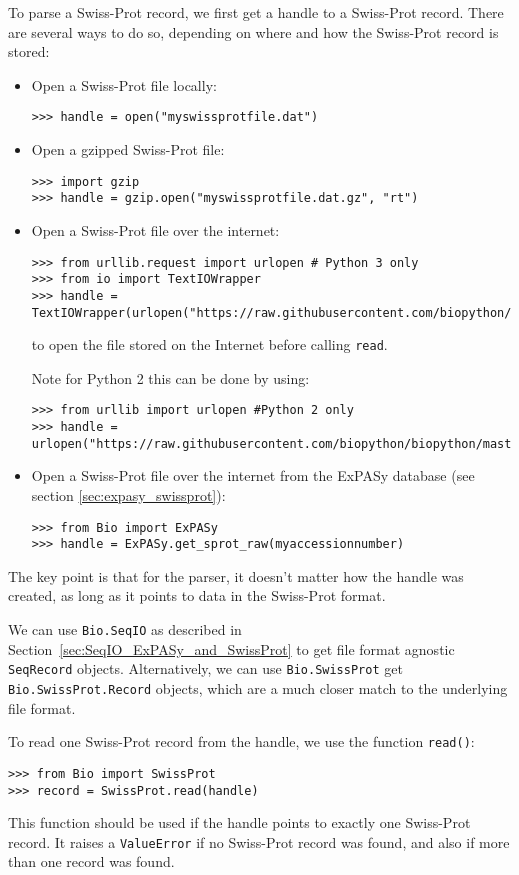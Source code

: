 To parse a Swiss-Prot record, we first get a handle to a Swiss-Prot record. There are several ways to do so, depending on where and how the Swiss-Prot record is stored:
\begin{itemize}
\item Open a Swiss-Prot file locally:
\begin{verbatim}
>>> handle = open("myswissprotfile.dat")
\end{verbatim} 
\item Open a gzipped Swiss-Prot file:
\begin{verbatim}
>>> import gzip
>>> handle = gzip.open("myswissprotfile.dat.gz", "rt")
\end{verbatim}
\item Open a Swiss-Prot file over the internet:
\begin{verbatim}
>>> from urllib.request import urlopen # Python 3 only
>>> from io import TextIOWrapper
>>> handle = TextIOWrapper(urlopen("https://raw.githubusercontent.com/biopython/biopython/master/Tests/SwissProt/F2CXE6.txt"))
\end{verbatim}
to open the file stored on the Internet before calling \verb|read|.

Note for Python 2 this can be done by using:
\begin{verbatim}
>>> from urllib import urlopen #Python 2 only
>>> handle = urlopen("https://raw.githubusercontent.com/biopython/biopython/master/Tests/SwissProt/F2CXE6.txt")
\end{verbatim}
\item Open a Swiss-Prot file over the internet from the ExPASy database
(see section \ref{sec:expasy_swissprot}):
\begin{verbatim}
>>> from Bio import ExPASy
>>> handle = ExPASy.get_sprot_raw(myaccessionnumber)
\end{verbatim}
\end{itemize}
The key point is that for the parser, it doesn't matter how the handle was created, as long as it points to data in the Swiss-Prot format.

We can use \verb+Bio.SeqIO+ as described in Section~\ref{sec:SeqIO_ExPASy_and_SwissProt} to get file format agnostic \verb|SeqRecord| objects.  Alternatively, we can use \verb+Bio.SwissProt+ get \verb|Bio.SwissProt.Record| objects, which are a much closer match to the underlying file format.

To read one Swiss-Prot record from the handle, we use the function \verb|read()|:
\begin{verbatim}
>>> from Bio import SwissProt
>>> record = SwissProt.read(handle)
\end{verbatim}
This function should be used if the handle points to exactly one Swiss-Prot record. It raises a \verb|ValueError| if no Swiss-Prot record was found, and also if more than one record was found.

